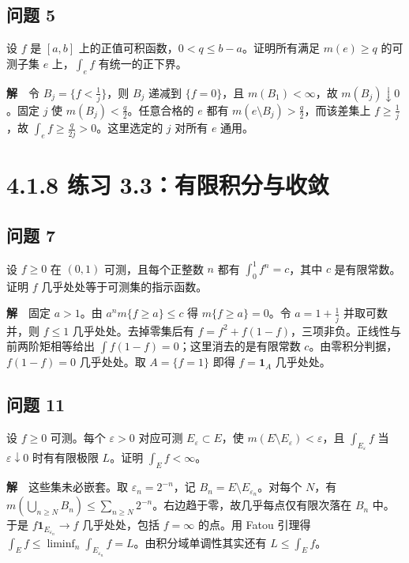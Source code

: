 \documentclass[11pt,a4paper]{article}
\begin{document}
\subsection{问题 5}\label{ux95eeux9898-5}

设 \(f\) 是 \([a,b]\) 上的正值可积函数，\(0<q\le b-a\)。证明所有满足
\(m(e)\ge q\) 的可测子集 \(e\) 上，\(\int_e f\) 有统一的正下界。

\textbf{解}　令 \(B_j=\{f<\frac1j\}\)，则 \(B_j\) 递减到 \(\{f=0\}\)，且
\(m(B_1)<\infty\)，故 \(m(B_j)\downarrow0\)。固定 \(j\) 使
\(m(B_j)<\frac q2\)。任意合格的 \(e\) 都有
\(m(e\setminus B_j)>\frac q2\)，而该差集上 \(f\ge\frac1j\)，故
\(\int_e f\ge \frac{q}{2j}>0\)。这里选定的 \(j\) 对所有 \(e\) 通用。

\clearpage\section[\S{}4.1.8 练习
3.3：有限积分与收敛]{4.1.8 练习
3.3：有限积分与收敛}\label{ux7ec3ux4e60-3.3ux6709ux9650ux79efux5206ux4e0eux6536ux655b}

\subsection{问题 7}\label{ux95eeux9898-7}

设 \(f\ge0\) 在 \((0,1)\) 可测，且每个正整数 \(n\) 都有
\(\int_0^1 f^n=c\)，其中 \(c\) 是有限常数。证明 \(f\)
几乎处处等于可测集的指示函数。

\textbf{解}　固定 \(a>1\)。由 \(a^n m\{f\ge a\}\le c\) 得
\(m\{f\ge a\}=0\)。令 \(a=1+\frac1j\) 并取可数并，则 \(f\le1\)
几乎处处。去掉零集后有
\(f=f^2+f(1-f)\)，三项非负。正线性与前两阶矩相等给出
\(\int f(1-f)=0\)；这里消去的是有限常数
\(c\)。由零积分判据，\(f(1-f)=0\) 几乎处处。取 \(A=\{f=1\}\) 即得
\(f=\mathbf1_A\) 几乎处处。

\subsection{问题 11}\label{ux95eeux9898-11}

设 \(f\ge0\) 可测。每个 \(\varepsilon>0\) 对应可测
\(E_\varepsilon\subset E\)，使
\(m(E\setminus E_\varepsilon)<\varepsilon\)，且
\(\int_{E_\varepsilon} f\) 当 \(\varepsilon\downarrow0\) 时有有限极限
\(L\)。证明 \(\int_E f<\infty\)。

\textbf{解}　这些集未必嵌套。取 \(\varepsilon_n=2^{-n}\)，记
\(B_n=E\setminus E_{\varepsilon_n}\)。对每个 \(N\)，有
\(m(\bigcup_{n\ge N}B_n)\le\sum_{n\ge N}2^{-n}\)。右边趋于零，故几乎每点仅有限次落在
\(B_n\) 中。于是 \(f\mathbf1_{E_{\varepsilon_n}}\to f\) 几乎处处，包括
\(f=\infty\) 的点。用 Fatou 引理得
\(\int_E f\le\liminf_n\int_{E_{\varepsilon_n}}f=L\)。由积分域单调性其实还有
\(L\le\int_Ef\)。
\end{document}
